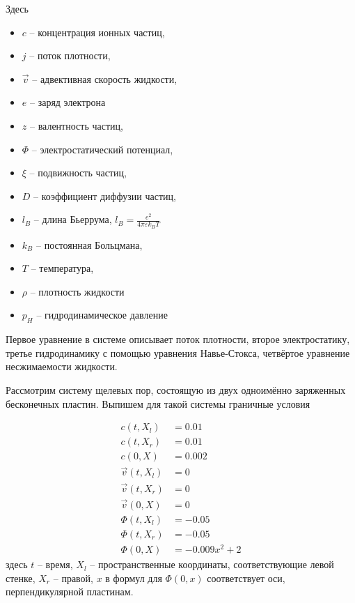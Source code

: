 \documentclass[a4paper,12pt]{article} %
\begin{document}
Здесь 
\begin{itemize}
    \item $c$ -- концентрация ионных частиц,
    \item $j$ -- поток плотности,
    \item $\vec{v}$ -- адвективная скорость жидкости,
    \item $e$ -- заряд электрона
    \item $z$ -- валентность частиц,
    \item $\Phi$ -- электростатический потенциал,
    \item $\xi$ -- подвижность частиц,
    \item $D$ -- коэффициент диффузии частиц,
    \item $l_B$ -- длина Бьеррума, $l_B = \frac{e^2}{4\pi\varepsilon k_B T}$
    \item $k_B$ -- постоянная Больцмана,
    \item $T$ -- температура,
    \item $\rho$ -- плотность жидкости
    \item $p_H$ -- гидродинамическое давление
\end{itemize}

Первое уравнение в системе описывает поток плотности, второе электростатику, третье гидродинамику с помощью уравнения Навье-Стокса, четвёртое уравнение несжимаемости жидкости.

Рассмотрим систему щелевых пор, состоящую из двух одноимённо заряженных бесконечных пластин. Выпишем для такой системы граничные условия

$$
    \begin{aligned}
        c(t, X_l)       & = 0.01        \\
        c(t, X_r)       & = 0.01        \\
        c(0, X)         & = 0.002       \\
        \vec{v}(t, X_l) & = 0           \\
        \vec{v}(t, X_r) & = 0           \\
        \vec{v}(0, X)   & = 0           \\
        \Phi(t, X_l)    & = -0.05       \\
        \Phi(t, X_r)    & = -0.05       \\
        \Phi(0, X)      & = -0.009x^2+2
    \end{aligned}
$$
здесь $t$ -- время, $X_l$ -- пространственные координаты, соответствующие левой стенке, $X_r$ -- правой, $x$ в формул для $\Phi(0,x)$ соответствует оси, перпендикулярной пластинам.
\end{document}
